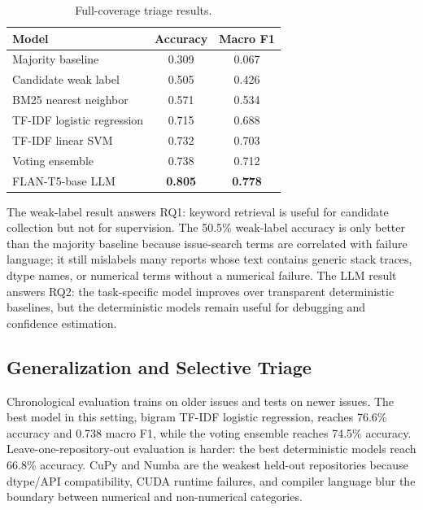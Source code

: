 \documentclass[sigplan,10pt]{acmart}
\begin{document}
\begin{table}[t]
\centering
\caption{Full-coverage triage results.}
\label{tab:fullcoverage}
\begin{tabular}{lcc}
\toprule
Model & Accuracy & Macro F1 \\
\midrule
Majority baseline & 0.309 & 0.067 \\
Candidate weak label & 0.505 & 0.426 \\
BM25 nearest neighbor & 0.571 & 0.534 \\
TF-IDF logistic regression & 0.715 & 0.688 \\
TF-IDF linear SVM & 0.732 & 0.703 \\
Voting ensemble & 0.738 & 0.712 \\
FLAN-T5-base LLM & \textbf{0.805} & \textbf{0.778} \\
\bottomrule
\end{tabular}
\end{table}

The weak-label result answers RQ1: keyword retrieval is useful for candidate
collection but not for supervision. The 50.5\% weak-label accuracy is only
better than the majority baseline because issue-search terms are correlated
with failure language; it still mislabels many reports whose text contains
generic stack traces, dtype names, or numerical terms without a numerical
failure. The LLM result answers RQ2: the task-specific model improves over
transparent deterministic baselines, but the deterministic models remain useful
for debugging and confidence estimation.

\subsection{Generalization and Selective Triage}

Chronological evaluation trains on older issues and tests on newer issues. The
best model in this setting, bigram TF-IDF logistic regression, reaches 76.6\%
accuracy and 0.738 macro F1, while the voting ensemble reaches 74.5\% accuracy.
Leave-one-repository-out evaluation is harder: the best deterministic models
reach 66.8\% accuracy. CuPy and Numba are the weakest held-out repositories
because dtype/API compatibility, CUDA runtime failures, and compiler language
blur the boundary between numerical and non-numerical categories.
\end{document}
